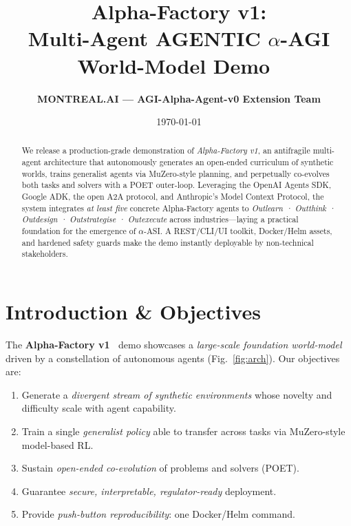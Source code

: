 \documentclass[11pt]{article}
\title{\bfseries Alpha-Factory v1:\\
  Multi-Agent AGENTIC \boldmath$\alpha$-AGI World-Model Demo
  \texorpdfstring{\emoji{👁️}\,\emoji{✨}}{}}
\author{\textbf{MONTREAL.AI — AGI-Alpha-Agent-v0 Extension Team}}
\date{\today}
\begin{document}
\maketitle
\begin{abstract}\noindent
We release a production-grade demonstration of \emph{Alpha-Factory v1}, an
antifragile multi-agent architecture that autonomously generates an
open-ended curriculum of synthetic worlds, trains generalist agents via
MuZero-style planning, and perpetually co-evolves both tasks and solvers with a
POET outer-loop.  Leveraging the OpenAI Agents SDK, Google ADK, the open
\textsc{A2A} protocol, and Anthropic’s Model Context Protocol, the system
integrates \emph{at least five} concrete Alpha-Factory agents to
\emph{Outlearn · Outthink · Outdesign · Outstrategise · Outexecute} across
industries—laying a practical foundation for the emergence of $\alpha$-ASI.
A REST/CLI/UI toolkit, Docker/Helm assets, and hardened safety guards make the
demo instantly deployable by non-technical stakeholders.
\end{abstract}

\tableofcontents
\newpage

\section{Introduction \& Objectives}\label{sec:intro}

The \textbf{Alpha-Factory v1 \,} demo showcases a
\emph{large-scale foundation world-model} driven by a constellation of
autonomous agents (Fig.~\ref{fig:arch}).  Our objectives are:
\begin{enumerate}[leftmargin=2em,label=\textbf{O\arabic*.}]
  \item Generate a \emph{divergent stream of synthetic environments} whose
        novelty and difficulty scale with agent capability.
  \item Train a single \emph{generalist policy} able to transfer across tasks
        via MuZero-style model-based RL.
  \item Sustain \emph{open-ended co-evolution} of problems and solvers (POET).
  \item Guarantee \emph{secure, interpretable, regulator-ready} deployment.
  \item Provide \emph{push-button reproducibility}: one Docker/Helm command.
\end{enumerate}
\end{document}
